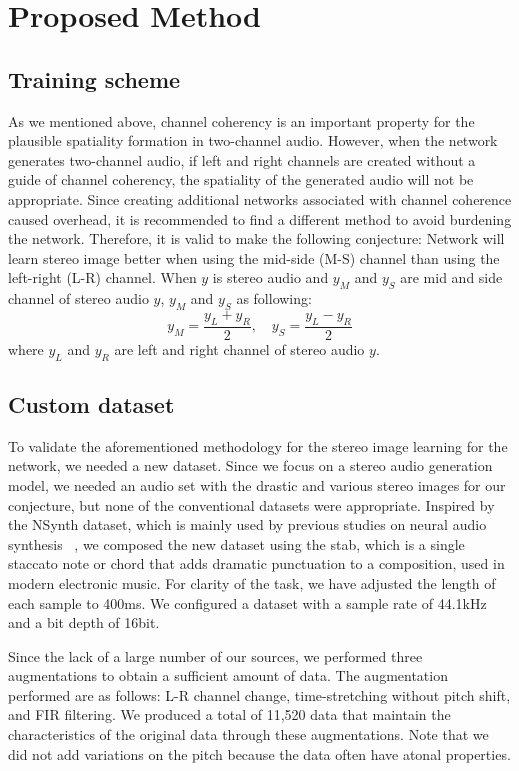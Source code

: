 \section{Proposed Method}
\label{sec:method}

\subsection{Training scheme}
\label{subsec:trainingscheme}

As we mentioned above, channel coherency is an important property for the plausible spatiality formation in two-channel audio. However, when the network generates two-channel audio, if left and right channels are created without a guide of channel coherency, the spatiality of the generated audio will not be appropriate. Since creating additional networks associated with channel coherence caused overhead, it is recommended to find a different method to avoid burdening the network. Therefore, it is valid to make the following conjecture: Network will learn stereo image better when using the mid-side (M-S) channel than using the left-right (L-R) channel. When $y$ is stereo audio and $y_M$ and $y_S$ are mid and side channel of stereo audio $y$, $y_M$ and $y_S$ as following:
\begin{equation}
    y_M = {\frac{y_L + y_R}{2}},\quad
    y_S = {\frac{y_L - y_R}{2}}\nonumber
\end{equation}
where $y_L$ and $y_R$ are left and right channel of stereo audio $y$.

\subsection{Custom dataset}
\label{subsec:dataset}
To validate the aforementioned methodology for the stereo image learning for the network, we needed a new dataset. Since we focus on a stereo audio generation model, we needed an audio set with the drastic and various stereo images for our conjecture, but none of the conventional datasets were appropriate. Inspired by the NSynth dataset, which is mainly used by previous studies on neural audio synthesis ~\cite{gansynth, nsynth}, we composed the new dataset using the stab, which is a single staccato note or chord that adds dramatic punctuation to a composition, used in modern electronic music. For clarity of the task, we have adjusted the length of each sample to 400ms. We configured a dataset with a sample rate of 44.1kHz and a bit depth of 16bit.

Since the lack of a large number of our sources, we performed three augmentations to obtain a sufficient amount of data. The augmentation performed are as follows: L-R channel change, time-stretching without pitch shift, and FIR filtering. We produced a total of 11,520 data that maintain the characteristics of the original data through these augmentations. Note that we did not add variations on the pitch because the data often have atonal properties.